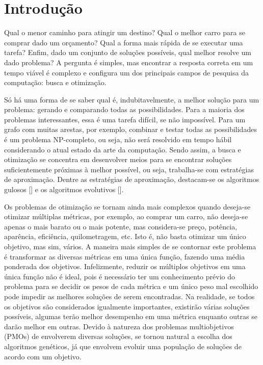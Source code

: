 \chapter[Introdução]{Introdução}

Qual o menor caminho para atingir um destino? Qual o melhor carro para se comprar dado um orçamento? Qual a forma mais rápida de se executar uma tarefa? Enfim, dado um conjunto de soluções possíveis, qual melhor resolve um dado problema? A pergunta é simples, mas encontrar a resposta correta em um tempo viável é complexo e configura um dos principais campos de pesquisa da computação: busca e otimização.

Só há uma forma de se saber qual é, indubitavelmente, a melhor solução para um problema: gerando e comparando todas as possibilidades. Para a maioria dos problemas interessantes, essa é uma tarefa difícil, se não impossível. Para um grafo com muitas arestas, por exemplo, combinar e testar todas as possibilidades é um problema NP-completo, ou seja, não será resolvido em tempo hábil considerando o atual estado da arte da computação. Sendo assim, a busca e otimização se concentra em desenvolver meios para se encontrar soluções suficientemente próximas à melhor possível, ou seja, trabalha-se com estratégias de aproximação. Dentre as estratégias de aproximação, destacam-se os algoritmos gulosos [] e os algoritmos evolutivos [].

Os problemas de otimização se tornam ainda mais complexos quando deseja-se otimizar múltiplas métricas, por exemplo, ao comprar um carro, não deseja-se apenas o mais barato ou o mais potente, mas considera-se preço, potência, aparência, eficiência, quilometragem, etc. Isto é, não basta otimizar um único objetivo, mas sim, vários. A maneira mais simples de se contornar este problema é transformar as diversas métricas em uma única função, fazendo uma média ponderada dos objetivos. Infelizmente, reduzir os múltiplos objetivos em uma única função não é ideal, pois é necessário ter um conhecimento prévio do problema para se decidir os pesos de cada métrica e um único peso mal escolhido pode impedir as melhores soluções de serem encontradas. Na realidade, se todos os objetivos são considerados igualmente importantes, existirão várias soluções possíveis, algumas terão melhor desempenho em uma métrica enquanto outras se darão melhor em outras. Devido à natureza dos problemas multiobjetivos (PMOs) de envolverem diversas soluções, se tornou natural a escolha dos algoritmos genéticos, já que envolvem evoluir uma população de soluções de acordo com um objetivo.

